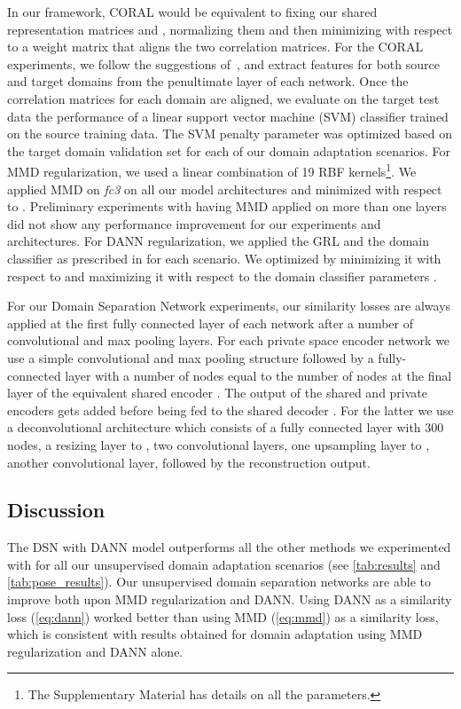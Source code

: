 \documentclass{article}
\begin{document}
 In our framework, CORAL \cite{sun2015return} would be equivalent to fixing our shared representation matrices  and , normalizing them and then minimizing  with respect to a weight matrix  that aligns the two correlation matrices. For the {CORAL} experiments, we follow the suggestions of~\cite{sun2015return}, and extract features for both source and target domains from the penultimate layer of each network. Once the correlation matrices for each domain are aligned, we evaluate on the target test data the performance of a linear support vector machine (SVM) classifier trained on the source training data. The SVM penalty parameter was optimized based on the target domain validation set for each of our domain adaptation scenarios. 
For MMD regularization, we used a linear combination of 19 RBF kernels\footnote{The Supplementary Material has details on all the parameters.}. We applied MMD on \textsl{fc3} on all our model architectures and minimized
 with respect to .
Preliminary experiments with having MMD applied on more than one layers did not show any performance improvement for our experiments and architectures. 
For DANN regularization, we applied the GRL and the domain classifier as prescribed in \cite{ganin2016domain} for each scenario. We optimized
 by minimizing it with respect to  and maximizing it with respect to the domain classifier parameters .

For our Domain Separation Network experiments, our similarity losses are always applied at the first fully connected layer of each network after a number of convolutional and max pooling layers. For each private space encoder network we use a simple convolutional and max pooling structure followed by a fully-connected layer with a number of nodes equal to the number of nodes at the final layer  of the equivalent shared encoder . The output of the shared and private encoders gets added before being fed to the shared decoder .
For the latter we use a deconvolutional architecture \cite{zeiler2010deconvolutional} which consists of a fully connected layer with 300 nodes, a resizing layer to , two  convolutional layers, one upsampling layer to , another  convolutional layer, followed by the reconstruction output.













\subsection{Discussion}
\label{sec:discussion}
 The DSN with DANN model outperforms all the other methods we experimented with for all our unsupervised domain adaptation scenarios (see \autoref{tab:results} and \ref{tab:pose_results}). Our unsupervised domain separation networks are able to improve both upon MMD regularization and DANN.  Using DANN as a similarity loss (\autoref{eq:dann}) worked better than using MMD (\autoref{eq:mmd}) as a similarity loss, which is consistent with results obtained for domain adaptation using MMD regularization and DANN alone.
\end{document}
